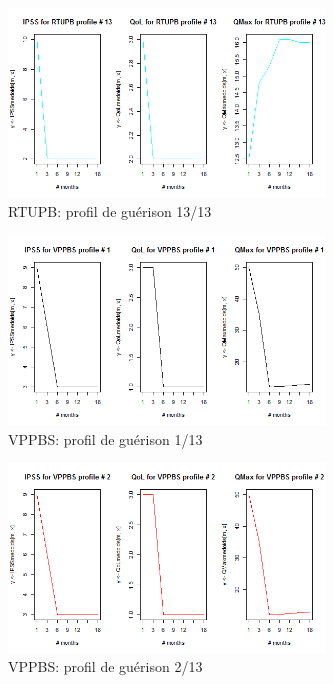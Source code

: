 \begin{figure}[H]
\centering
\includegraphics[width=0.75\textwidth]{../Fig/RTUPB/rtupb-profil-post-13.png}
\caption{RTUPB: profil de guérison 13/13}
\end{figure}

%

\begin{figure}[H]
\centering
\includegraphics[width=0.75\textwidth]{../Fig/VPPBS/vppbs-profil-post-01.png}
\caption{VPPBS: profil de guérison 1/13}
\end{figure}

\begin{figure}[H]
\centering
\includegraphics[width=0.75\textwidth]{../Fig/VPPBS/vppbs-profil-post-02.png}
\caption{VPPBS: profil de guérison 2/13}
\end{figure}

